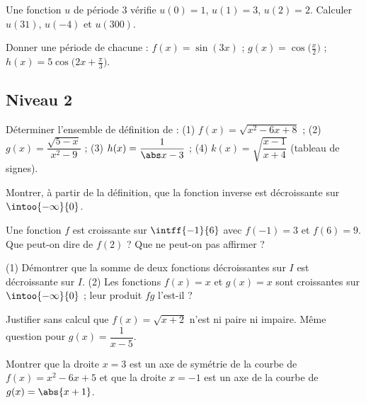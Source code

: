 \begin{exercise}
Une fonction $u$ de période $3$ vérifie $u(0)=1$, $u(1)=3$, $u(2)=2$. Calculer $u(31)$, $u(-4)$ et $u(300)$.
\end{exercise}
\begin{exercise}
Donner une période de chacune : $f(x)=\sin(3x)$ ; $g(x)=\cos\bigl(\frac x2\bigr)$ ; $h(x)=5\cos\bigl(2x+\frac\pi3\bigr)$.
\end{exercise}
\subsection*{Niveau 2}
\begin{exercise}
Déterminer l'ensemble de définition de : (1) $f(x)=\sqrt{x^2-6x+8}$ ; (2) $g(x)=\dfrac{\sqrt{5-x}}{x^2-9}$ ; (3) $h(x)=\dfrac{1}{\abs x-3}$ ; (4) $k(x)=\sqrt{\dfrac{x-1}{x+4}}$ (tableau de signes).
\end{exercise}
\begin{exercise}
Montrer, à partir de la définition, que la fonction inverse est décroissante sur $\intoo{-\infty}{0}$.
\end{exercise}
\begin{exercise}
Une fonction $f$ est croissante sur $\intff{-1}{6}$ avec $f(-1)=3$ et $f(6)=9$. Que peut-on dire de $f(2)$ ? Que ne peut-on pas affirmer ?
\end{exercise}
\begin{exercise}
(1) Démontrer que la somme de deux fonctions décroissantes sur $I$ est décroissante sur $I$. (2) Les fonctions $f(x)=x$ et $g(x)=x$ sont croissantes sur $\intoo{-\infty}{0}$ ; leur produit $fg$ l'est-il ?
\end{exercise}
\begin{exercise}
Justifier sans calcul que $f(x)=\sqrt{x+2}$ n'est ni paire ni impaire. Même question pour $g(x)=\dfrac{1}{x-5}$.
\end{exercise}
\begin{exercise}
Montrer que la droite $x=3$ est un axe de symétrie de la courbe de $f(x)=x^2-6x+5$ et que la droite $x=-1$ est un axe de la courbe de $g(x)=\abs{x+1}$.
\end{exercise}
